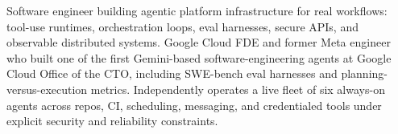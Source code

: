 


Software engineer building agentic platform infrastructure for real workflows: tool-use runtimes, orchestration loops, eval harnesses, secure APIs, and observable distributed systems. Google Cloud FDE and former Meta engineer who built one of the first Gemini-based software-engineering agents at Google Cloud Office of the CTO, including SWE-bench eval harnesses and planning-versus-execution metrics. Independently operates a live fleet of six always-on agents across repos, CI, scheduling, messaging, and credentialed tools under explicit security and reliability constraints.







